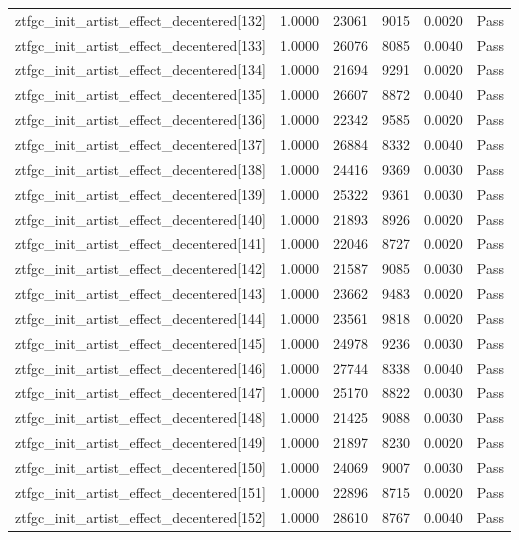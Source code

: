 \begin{table}[htbp]
\begin{tabular}{llrrll}
ztfgc\_init\_artist\_effect\_decentered[132] & 1.0000 & 23061 & 9015 & 0.0020 & Pass \\
ztfgc\_init\_artist\_effect\_decentered[133] & 1.0000 & 26076 & 8085 & 0.0040 & Pass \\
ztfgc\_init\_artist\_effect\_decentered[134] & 1.0000 & 21694 & 9291 & 0.0020 & Pass \\
ztfgc\_init\_artist\_effect\_decentered[135] & 1.0000 & 26607 & 8872 & 0.0040 & Pass \\
ztfgc\_init\_artist\_effect\_decentered[136] & 1.0000 & 22342 & 9585 & 0.0020 & Pass \\
ztfgc\_init\_artist\_effect\_decentered[137] & 1.0000 & 26884 & 8332 & 0.0040 & Pass \\
ztfgc\_init\_artist\_effect\_decentered[138] & 1.0000 & 24416 & 9369 & 0.0030 & Pass \\
ztfgc\_init\_artist\_effect\_decentered[139] & 1.0000 & 25322 & 9361 & 0.0030 & Pass \\
ztfgc\_init\_artist\_effect\_decentered[140] & 1.0000 & 21893 & 8926 & 0.0020 & Pass \\
ztfgc\_init\_artist\_effect\_decentered[141] & 1.0000 & 22046 & 8727 & 0.0020 & Pass \\
ztfgc\_init\_artist\_effect\_decentered[142] & 1.0000 & 21587 & 9085 & 0.0030 & Pass \\
ztfgc\_init\_artist\_effect\_decentered[143] & 1.0000 & 23662 & 9483 & 0.0020 & Pass \\
ztfgc\_init\_artist\_effect\_decentered[144] & 1.0000 & 23561 & 9818 & 0.0020 & Pass \\
ztfgc\_init\_artist\_effect\_decentered[145] & 1.0000 & 24978 & 9236 & 0.0030 & Pass \\
ztfgc\_init\_artist\_effect\_decentered[146] & 1.0000 & 27744 & 8338 & 0.0040 & Pass \\
ztfgc\_init\_artist\_effect\_decentered[147] & 1.0000 & 25170 & 8822 & 0.0030 & Pass \\
ztfgc\_init\_artist\_effect\_decentered[148] & 1.0000 & 21425 & 9088 & 0.0030 & Pass \\
ztfgc\_init\_artist\_effect\_decentered[149] & 1.0000 & 21897 & 8230 & 0.0020 & Pass \\
ztfgc\_init\_artist\_effect\_decentered[150] & 1.0000 & 24069 & 9007 & 0.0030 & Pass \\
ztfgc\_init\_artist\_effect\_decentered[151] & 1.0000 & 22896 & 8715 & 0.0020 & Pass \\
ztfgc\_init\_artist\_effect\_decentered[152] & 1.0000 & 28610 & 8767 & 0.0040 & Pass \\

\end{tabular}
\end{table}
